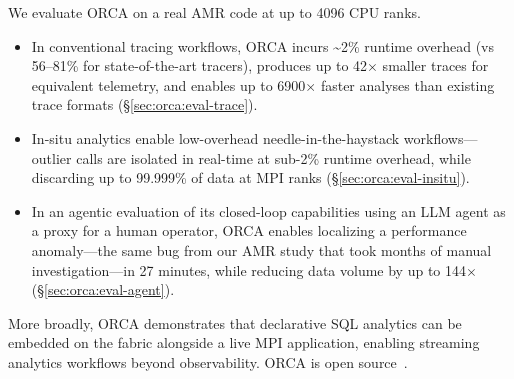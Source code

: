 We evaluate ORCA on a real AMR code at up to 4096 CPU ranks.

\begin{itemize}[leftmargin=*]
  \item In conventional tracing workflows, ORCA incurs \textasciitilde{2}\% runtime overhead
        (vs 56--81\% for state-of-the-art tracers), produces up to 42$\times$ smaller
        traces for equivalent telemetry, and enables up to
        6900$\times$ faster analyses than existing trace formats (\S\ref{sec:orca:eval-trace}).
  \item In-situ analytics enable low-overhead needle-in-the-haystack
        workflows---outlier \mpiw{} calls are isolated in real-time at sub-2\% runtime
        overhead, while discarding up to 99.999\% of data at MPI ranks (\S\ref{sec:orca:eval-insitu}).
  \item In an agentic evaluation of its closed-loop capabilities using an LLM
        agent as a proxy for a human operator, ORCA enables localizing a performance
        anomaly---the same bug from our AMR study that took months of manual
        investigation---in 27 minutes, while reducing data volume by up to
        144$\times$ (\S\ref{sec:orca:eval-agent}).
\end{itemize}
More broadly, ORCA demonstrates that declarative SQL analytics can be embedded on the fabric
alongside a live MPI application, enabling streaming analytics workflows beyond observability.
ORCA is open source~\cite{Jain2026:orca-code}.




